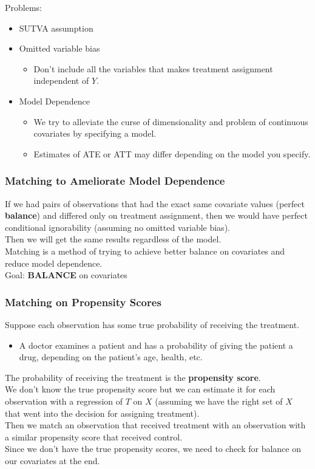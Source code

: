 \documentclass[handout]{beamer}
\begin{document}
\begin{frame}
Problems:
\pause
\bigskip
\begin{itemize}
\item SUTVA assumption
\pause
\bigskip
\item Omitted variable bias
\pause
\begin{itemize}
\item Don't include all the variables that makes treatment assignment independent of $Y$.
\end{itemize}
\pause
\bigskip
\item Model Dependence
\pause
\begin{itemize}
\item We try to alleviate the curse of dimensionality and problem of
continuous covariates by specifying a model.
\pause
\item Estimates of ATE or ATT may differ depending on the model you specify.
\end{itemize}
\end{itemize}
\end{frame}

\begin{frame}
\frametitle{Matching to Ameliorate Model Dependence}
\pause
If we had pairs of observations that had the exact same covariate
values (perfect {\bf balance}) and differed only on treatment assignment, then we would have
perfect conditional ignorability (assuming no omitted variable
bias).\\
\pause
\bigskip
Then we will get the same results regardless of the model.\\
\pause
\bigskip
Matching is a method of trying to achieve better balance on covariates
and reduce model dependence. \\
\pause
\bigskip
Goal: {\bf BALANCE} on covariates
\end{frame}

\begin{frame}
\frametitle{Matching on Propensity Scores}
\pause
Suppose each observation has some true probability of receiving the
treatment.
\pause
\begin{itemize}
\item A doctor examines a patient and has a probability of
giving the patient a drug, depending on the patient's age, health, etc.
\end{itemize}
\bigskip
\pause
The probability of receiving the treatment is the {\bf propensity
score}. \\
\pause
\bigskip
We don't know the true propensity score but we can estimate it for
each observation with a regression of $T$ on $X$ \pause (assuming we have the
right set of $X$ that went into the decision for assigning
treatment).\\
\pause
\bigskip
Then we match an observation that received treatment with an
observation with a similar propensity score that received control.\\
\pause
\bigskip
Since we don't have the true propensity scores, we need to check for
balance on our covariates at the end.
\end{frame}
\end{document}
